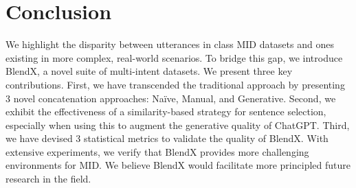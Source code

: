 \section{Conclusion}
\label{sec:conclusion}

We highlight the disparity between utterances in class MID datasets and ones existing in more complex, real-world scenarios.
To bridge this gap, we introduce BlendX, a novel suite of multi-intent datasets.
We present three key contributions. 
First, we have transcended the traditional approach by presenting 3 novel concatenation approaches: Na\"ive, Manual, and Generative.
Second, we exhibit the effectiveness of a similarity-based strategy for sentence selection, especially when using this to augment the generative quality of ChatGPT.
Third, we have devised 3 statistical metrics to validate the quality of BlendX.
With extensive experiments, we verify that BlendX provides more challenging environments for MID.
We believe BlendX would facilitate more principled future research in the field.
